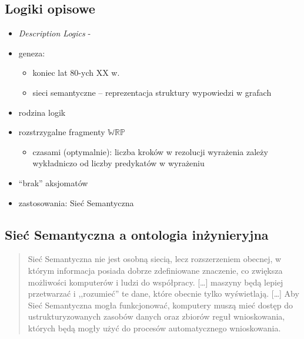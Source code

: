 \documentclass[12pt]{article}
\newcommand {\WRP} {\ensuremath{\mathbb{WRP}}}
\begin{document}
\subsection{Logiki opisowe}
%
\begin{itemize}
\item \emph{Description Logics} - \cite{DBLP:conf/dlog/2003handbook}
%
\item geneza:
\begin{itemize}
\item koniec lat 80-ych XX w.
\item sieci semantyczne -- reprezentacja struktury wypowiedzi w grafach
\end{itemize}
%
\item rodzina logik
%
\item rozstrzygalne fragmenty \WRP
\begin{itemize}
\item czasami (optymalnie): liczba kroków w rezolucji wyrażenia zależy wykładniczo od liczby predykatów w wyrażeniu
\end{itemize}
%
\item ``brak'' aksjomatów
%
\item zastosowania: Sieć Semantyczna
\end{itemize}
%

\subsection{Sieć Semantyczna a ontologia inżynieryjna}
%
\begin{quote} Sieć Semantyczna nie jest osobną siecią, lecz rozszerzeniem obecnej, w którym informacja posiada dobrze zdefiniowane znaczenie, co zwiększa możliwości komputerów i ludzi do współpracy. [\dots] maszyny będą lepiej przetwarzać i ,,rozumieć'' te dane, które obecnie tylko wyświetlają. [\dots] Aby Sieć Semantyczna mogła funkcjonować, komputery muszą mieć dostęp do ustrukturyzowanych zasobów danych oraz zbiorów reguł wnioskowania, których będą mogły użyć do procesów automatycznego wnioskowania. %
\end{quote}
%

\end{document}
